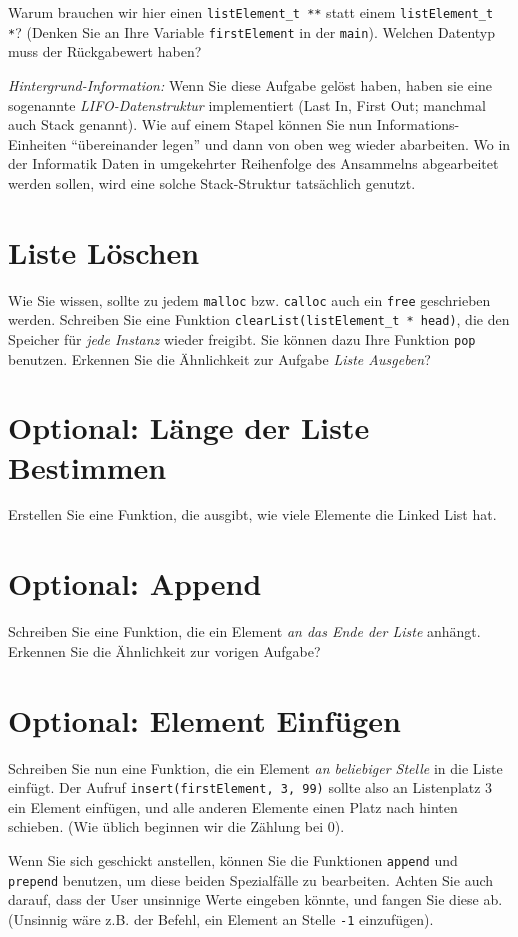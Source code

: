 \documentclass[
	ngerman,
	fontsize=10pt,
	parskip=half,
	titlepage=true,
	DIV=12
]{scrartcl}
\newcommand*{\inC}[1]{\texttt{#1}}
\begin{document}
Warum brauchen wir hier einen \texttt{listElement\_t **} statt einem \texttt{listElement\_t *}? (Denken Sie an Ihre Variable \texttt{firstElement} in der \texttt{main}). Welchen Datentyp muss der Rückgabewert haben?

\emph{Hintergrund-Information:} Wenn Sie diese Aufgabe gelöst haben, haben sie eine sogenannte \emph{LIFO-Datenstruktur} implementiert (Last In, First Out; manchmal auch Stack genannt). Wie auf einem Stapel können Sie nun Informations-Einheiten \enquote{übereinander legen} und dann von oben weg wieder abarbeiten. Wo in der Informatik Daten in umgekehrter Reihenfolge des Ansammelns abgearbeitet werden sollen, wird eine solche Stack-Struktur tatsächlich genutzt.

\section{Liste Löschen}
Wie Sie wissen, sollte zu jedem \texttt{malloc} bzw. \texttt{calloc} auch ein \texttt{free} geschrieben werden. Schreiben Sie eine Funktion \inC{clearList(listElement_t * head)}, die den Speicher für \emph{jede Instanz} wieder freigibt. Sie können dazu Ihre Funktion \texttt{pop} benutzen. Erkennen Sie die Ähnlichkeit zur Aufgabe \emph{Liste Ausgeben}?

\section{Optional: Länge der Liste Bestimmen}
Erstellen Sie eine Funktion, die ausgibt, wie viele Elemente die Linked List hat.

\section{Optional: Append}
Schreiben Sie eine Funktion, die ein Element \emph{an das Ende der Liste} anhängt. Erkennen Sie die Ähnlichkeit zur vorigen Aufgabe?

\section{Optional: Element Einfügen}
Schreiben Sie nun eine Funktion, die ein Element \emph{an beliebiger Stelle} in die Liste einfügt. Der Aufruf \texttt{insert(firstElement, 3, 99)} sollte also an Listenplatz 3 ein Element einfügen, und alle anderen Elemente einen Platz nach hinten schieben. (Wie üblich beginnen wir die Zählung bei 0).

Wenn Sie sich geschickt anstellen, können Sie die Funktionen \texttt{append} und \texttt{prepend} benutzen, um diese beiden Spezialfälle zu bearbeiten. Achten Sie auch darauf, dass der User unsinnige Werte eingeben könnte, und fangen Sie diese ab. (Unsinnig wäre z.\;B. der Befehl, ein Element an Stelle \texttt{-1} einzufügen).
\end{document}
